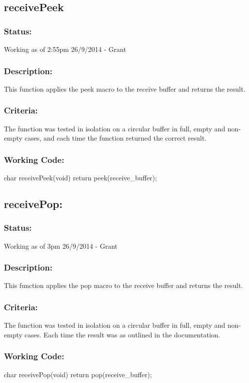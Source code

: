\documentclass[]{article}
\begin{document}
\subsection{receivePeek}
\subsubsection{Status:}
Working as of 2:55pm 26/9/2014 - Grant

\subsubsection{Description:}
This function applies the peek macro to the receive buffer and returns the result.

\subsubsection{Criteria:}
The function was tested in isolation on a circular buffer in full, empty and non-empty cases, and each time the function returned the correct result.

\subsubsection{Working Code:}
char receivePeek(void)
{
	return peek(receive\_buffer);
}

\subsection{receivePop:}
\subsubsection{Status:}
Working as of 3pm 26/9/2014 - Grant

\subsubsection{Description:}
This function applies the pop macro to the receive buffer and returns the result.

\subsubsection{Criteria:}
The function was tested in isolation on a circular buffer in full, empty and non-empty cases. Each time the result was as outlined in the documentation.

\subsubsection{Working Code:}
char receivePop(void)
{
	return pop(receive\_buffer);
}
\end{document}
